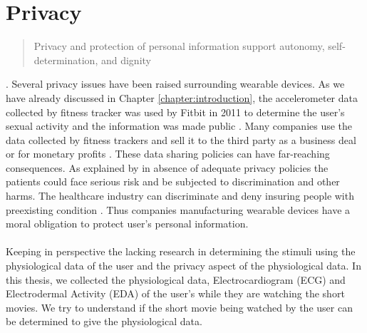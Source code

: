\section{Privacy} \blockquote{Privacy and protection of personal information support autonomy, self-determination, and dignity} \cite{hurley_taking_2014}. Several privacy issues have been raised surrounding wearable devices. As we have already discussed in Chapter \ref{chapter:introduction}, the accelerometer data collected by fitness tracker was used by Fitbit in 2011 to determine the user's sexual activity and the information was made public \cite{Fitbit}. Many companies use the data collected by fitness trackers and sell it to the third party as a business deal or for monetary profits \cite{ever_step_you_fake}. These data sharing policies can have far-reaching consequences. As explained by \citeauthor{montgomery_health_nodate} in absence of adequate privacy policies the patients could face serious risk and be subjected to discrimination and other harms. The healthcare industry can discriminate and deny insuring people with preexisting condition \cite{montgomery_health_nodate}. Thus companies manufacturing wearable devices have a moral obligation to protect user's personal information.

\paragraph{} Keeping in perspective the lacking research in determining the stimuli using the physiological data of the user and the privacy aspect of the physiological data. In this thesis, we collected the physiological data, Electrocardiogram (ECG) and Electrodermal Activity (EDA) of the user's while they are watching the short movies. We try to understand if the short movie being watched by the user can be determined to give the physiological data.


